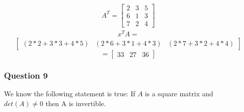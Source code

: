 \documentclass{article}
\begin{document}
\begin{align}
  A^T = 
  \begin{bmatrix}
    2 & 3 & 5\\
    6 & 1 & 3\\
    7 & 2 & 4
  \end{bmatrix}
\end{align}
\begin{align}
  x^TA = 
\end{align}
\[\begin{bmatrix}
  (2*2+3*3+4*5)& (2*6+3*1+4*3)& (2*7 + 3*2 + 4*4)
\end{bmatrix} \]
\[= \begin{bmatrix}
  33 & 27 & 36
\end{bmatrix}\]
\subsubsection*{Question 9}
We know the following statement is true: If $A$ is a square matrix and $det(A) \neq 0$ then A is
invertible. 
\end{document}
